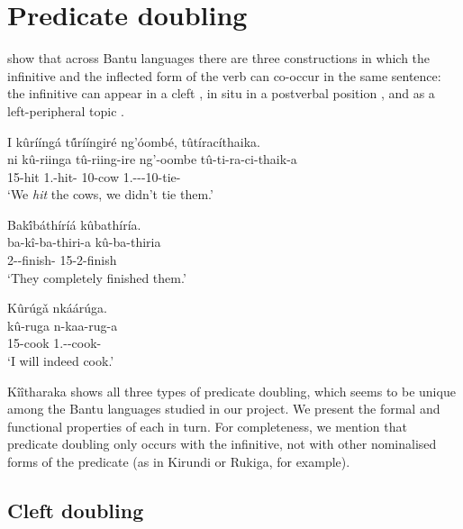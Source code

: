 \documentclass[output=paper]{langscibook}
\begin{document}
\section{Predicate doubling}
\label{bkm:Ref115942967}
\citet{GüldemannFiedler2019} show that across Bantu languages there are three constructions in which the infinitive and the inflected form of the verb can co-occur in the same sentence: the infinitive can appear in a cleft , in situ in a postverbal position , and as a left-peripheral topic .

\ea
\label{bkm:Ref93997547}
I  kûrííngá  t\'{û}rííngiré  ng’óombé, tûtíracíthaika.\hfill\relax[cleft]\\
\gll
ni  kû-riinga  tû-riing-ire  ng’-oombe   tû-ti-ra-ci-thaik-a  \\
\FOC{} 15-hit 1\PL.\SM{}-hit-\PFV{} 10-cow 1\PL.\SM-\NEG-\YPST{}-10\OM{}-tie-\FV{}\\  
\glt
‘We \textit{hit} the cows, we didn’t tie them.’

\z

\ea
\label{bkm:Ref93997562}
Bak\'{î}báthíríá  kûbathíría.\\
\gll
ba-kî-ba-thiri-a  kû-ba-thiria  \\
2\SM-\OM{}-finish-\FV{} 15-2\OM{}-finish\\ \jambox*{[in situ]}
\glt
‘They completely finished them.’

\z

\ea
\label{bkm:Ref93997557}
Kûrúgǎ  nkáárúga.\\
\gll
kû-ruga  n-kaa-rug-a \\
15-cook 1\SG.\SM-\FUT{}-cook-\FV{}\\ \jambox*{[topic]}
\glt
‘I will indeed cook.’

\z


Kîîtharaka shows all three types of predicate doubling, which seems to be unique among the Bantu languages studied in our project. We present the formal and functional properties of each in turn. For completeness, we mention that predicate doubling only occurs with the infinitive, not with other nominalised forms of the predicate (as in Kirundi or Rukiga, for example).

\subsection{Cleft doubling}
\end{document}

